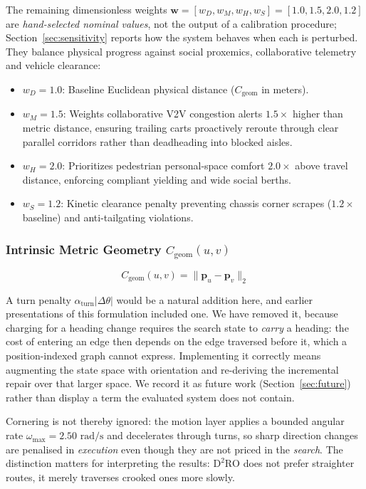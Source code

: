 \documentclass[journal]{IEEEtran}
\begin{document}
The remaining dimensionless weights $\mathbf{w} = [w_D, w_M, w_H, w_S] =
[1.0, 1.5, 2.0, 1.2]$ are \emph{hand-selected nominal values}, not the output of a
calibration procedure; Section~\ref{sec:sensitivity} reports how the system behaves
when each is perturbed. They balance physical progress against social proxemics,
collaborative telemetry and vehicle clearance:
\begin{itemize}
    \item $w_D = 1.0$: Baseline Euclidean physical distance ($C_{\text{geom}}$ in meters).
    \item $w_M = 1.5$: Weights collaborative V2V congestion alerts $1.5\times$ higher than metric distance, ensuring trailing carts proactively reroute through clear parallel corridors rather than deadheading into blocked aisles.
    \item $w_H = 2.0$: Prioritizes pedestrian personal-space comfort $2.0\times$ above travel distance, enforcing compliant yielding and wide social berths.
    \item $w_S = 1.2$: Kinetic clearance penalty preventing chassis corner scrapes ($1.2\times$ baseline) and anti-tailgating violations.
\end{itemize}

\subsubsection{Intrinsic Metric Geometry \texorpdfstring{$C_{\text{geom}}(u, v)$}{C\_geom(u, v)}}
\begin{equation}
C_{\text{geom}}(u, v) = \|\mathbf{p}_u - \mathbf{p}_v\|_2
\end{equation}

A turn penalty $\alpha_{\text{turn}}|\Delta\theta|$ would be a natural addition here, and earlier presentations of this formulation included one. We have removed it, because charging for a heading change requires the search state to \emph{carry} a heading: the cost of entering an edge then depends on the edge traversed before it, which a position-indexed graph cannot express. Implementing it correctly means augmenting the state space with orientation and re-deriving the incremental repair over that larger space. We record it as future work (Section~\ref{sec:future}) rather than display a term the evaluated system does not contain.

Cornering is not thereby ignored: the motion layer applies a bounded angular rate $\omega_{\max} = 2.50\text{ rad/s}$ and decelerates through turns, so sharp direction changes are penalised in \emph{execution} even though they are not priced in the \emph{search}. The distinction matters for interpreting the results: $\text{D}^2\text{RO}$ does not prefer straighter routes, it merely traverses crooked ones more slowly.
\end{document}
